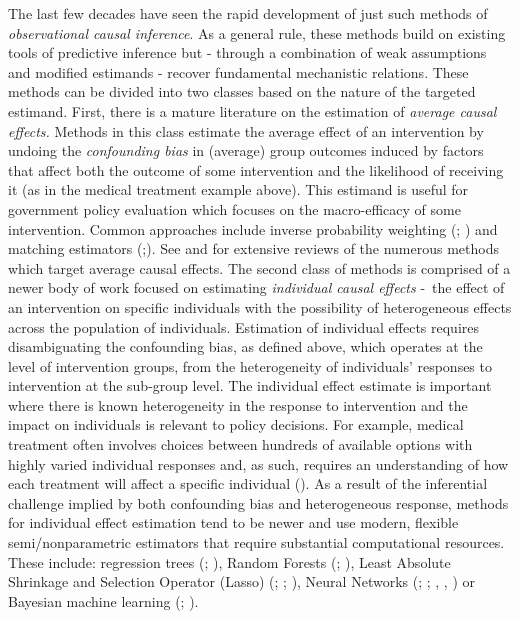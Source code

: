 \documentclass[../main.tex]{subfiles}
\begin{document}
\vspace{\baselineskip}
The last few decades have seen the rapid development of just such methods of \textit{observational causal inference}. As a general rule, these methods build on existing tools of predictive inference but - through a combination of weak assumptions and modified estimands - recover fundamental mechanistic relations. These methods can be divided into two classes based on the nature of the targeted estimand. First, there is a mature literature on the estimation of \textit{average causal effects. }Methods in this class estimate the average effect of an intervention by undoing the \textit{confounding bias} in (average) group outcomes induced by factors that affect both the outcome of some intervention and the likelihood of receiving it (as in the medical treatment example above). This estimand is useful for government policy evaluation which focuses on the macro-efficacy of some intervention. Common approaches include inverse probability weighting (\cite{Horvitz1952AUniverse}; \cite{Hirano2003EFFICIENTSCORE}) and matching estimators (\cite{Rubin1974EstimatingStudies};\cite{ROSENBAUM1983TheEffects}). See \cite{Imbens2009RecentEvaluation} and \cite{Athey2017TheEvaluation} for extensive reviews of the numerous methods which target average causal effects. The second class of methods is comprised of a newer body of work focused on estimating \textit{individual causal effects }-\ the effect of an intervention on specific individuals with the possibility of heterogeneous effects across the population of individuals. Estimation of individual effects requires disambiguating the confounding bias, as defined above, which operates at the level of intervention groups, from the heterogeneity of individuals’ responses to intervention at the sub-group level. The individual effect estimate is important where there is known heterogeneity in the response to intervention and the impact on individuals is relevant to policy decisions. For example, medical treatment often involves choices between hundreds of available options with highly varied individual responses and, as such, requires an understanding of how each treatment will affect a specific individual (\cite{Lu2018EstimatingMethods}). As a result of the inferential challenge implied by both confounding bias and heterogeneous response, methods for individual effect estimation tend to be newer and use modern, flexible semi/nonparametric estimators that require substantial computational resources. These include: regression trees (\cite{Su2009SubgroupTsai}; \cite{Athey2016RecursiveEffects}), Random Forests (\cite{Wager2018EstimationForests}; \cite{Athey2019GeneralizedForests}), Least Absolute Shrinkage and Selection Operator (Lasso) (\cite{Qian2011PerformanceRules}; \cite{Tian2014ACovariates}; \cite{Chen2017AScoring}), Neural Networks  (\cite{Johansson2016LearningInference}; \cite{Johansson2018LearningDesigns}; \cite{SchwabPerfectNetworks}, \cite{LiMatchingEstimation}, \cite{Kunzel2018TransferNetworks}) or Bayesian machine learning (\cite{Hill2011BayesianInference}; \cite{Taddy2016AExperimentation}).\par
\end{document}
